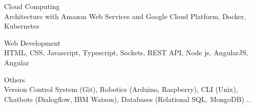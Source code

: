 \begin{multicols}{3}
    \cvskill
        {Cloud Computing} %
        {\\Architecture with Amazon Web Services and Google Cloud Platform, Docker, Kubernetes}
        
    \cvskill
        {Web Development} %
        {\\HTML, CSS, Javascript, Typescript, Sockets, REST API, Node js, AngularJS, Angular}
        
    \cvskill
        {Others} %
        {\\Version Control System (Git), Robotics (Arduino, Raspberry), CLI (Unix), Chatbots (Dialogflow, IBM Watson), Databases (Relational SQL, MongoDB) ..}
\end{multicols}
    
    

